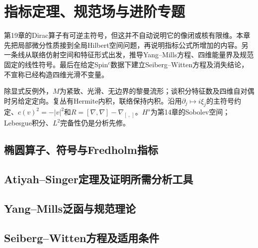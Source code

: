 \chapter{指标定理、规范场与进阶专题}
\label{ch:20-index-gauge}

第19章的Dirac算子有可逆主符号，但这并不自动说明它的像闭或核有限维。本章先把局部微分性质接到全局Hilbert空间问题，再说明指标公式所增加的内容。另一条线从联络仿射空间和特征形式出发，推导Yang--Mills方程、四维能量界及规范固定的线性符号。最后在给定Spin$^c$数据下建立Seiberg--Witten方程及消失结论，不宣称已经构造四维光滑不变量。

除显式反例外，$M$为紧致、光滑、无边界的黎曼流形；谈积分特征数及四维自对偶时另给定定向。复丛有Hermite内积，联络保持内积。沿用$\partial_j\mapsto i\xi_j$的主符号约定、$c(v)^2=-|v|^2$和$R=[\nabla,\nabla]-\nabla_{[\ ,\ ]}$。$H^s$为第14章的Sobolev空间；Lebesgue积分、$L^2$完备性仍是分析先修。

\section{椭圆算子、符号与Fredholm指标}



\section{Atiyah--Singer定理及证明所需分析工具}


\section{Yang--Mills泛函与规范理论}




\section{Seiberg--Witten方程及适用条件}



